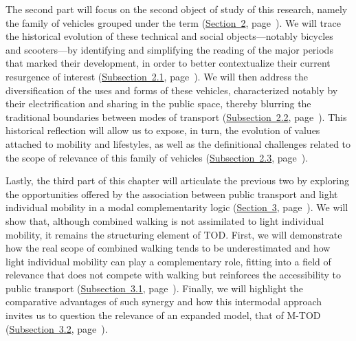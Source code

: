 \begin{refsegment}
The second part will focus on the second object of study of this research, namely the family of vehicles grouped under the term  (\hyperref[chap1:mobilite-individuelle-legere]{Section~2}, page~\pageref{chap1:mobilite-individuelle-legere}). We will trace the historical evolution of these technical and social objects—notably bicycles and scooters—by identifying and simplifying the reading of the major periods that marked their development, in order to better contextualize their current resurgence of interest (\hyperref[chap1:proximite-velo-trottinette]{Subsection~2.1}, page~\pageref{chap1:proximite-velo-trottinette}). We will then address the diversification of the uses and forms of these vehicles, characterized notably by their electrification and sharing in the \gls{public space}, thereby blurring the traditional boundaries between modes of transport (\hyperref[chap1:velo-micromobilite-innovations]{Subsection~2.2}, page~\pageref{chap1:velo-micromobilite-innovations}). This historical reflection will allow us to expose, in turn, the evolution of values attached to mobility and lifestyles, as well as the definitional challenges related to the scope of relevance of this family of vehicles (\hyperref[chap1:caracterisation-mobilite-individuelle-legere]{Subsection~2.3}, page~\pageref{chap1:caracterisation-mobilite-individuelle-legere}).%

Lastly, the third part of this chapter will articulate the previous two by exploring the opportunities offered by the association between public transport and light individual mobility in a modal complementarity logic (\hyperref[chap1:btod]{Section~3}, page~\pageref{chap1:btod}). We will show that, although combined walking is not assimilated to light individual mobility, it remains the structuring element of \acrshort{TOD}. First, we will demonstrate how the real scope of combined walking tends to be underestimated and how light individual mobility can play a complementary role, fitting into a field of relevance that does not compete with walking but reinforces the \gls{accessibility} to public transport (\hyperref[chap1:btod-limites-tod]{Subsection~3.1}, page~\pageref{chap1:btod-limites-tod}). Finally, we will highlight the comparative advantages of such synergy and how this intermodal approach invites us to question the relevance of an expanded model, that of \acrfull{M-TOD} (\hyperref[chap1:btod-m-tod]{Subsection~3.2}, page~\pageref{chap1:btod-m-tod}).%


\end{refsegment}

